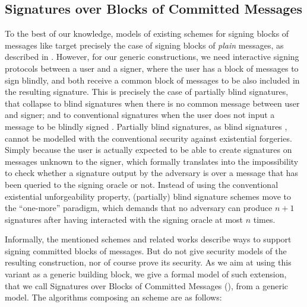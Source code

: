 \subsection{Signatures over Blocks of Committed Messages}
\label{sapp:sbcm}

To the best of our knowledge, models of existing schemes for signing blocks of
messages like \cite{cl02,asm06,ps16} target precisely the case of signing blocks
of \emph{plain} messages, as described in . However, for our
generic constructions, we need interactive signing protocols between a user
and a signer, where the user has a block of messages to sign blindly, and both
receive a common block of messages to be also included in the resulting
signature. This is precisely the case of partially blind signatures, that
collapse to blind signatures when there is no common message between user
and signer; and to conventional signatures when the user does not input a
message to be blindly signed \cite{ao00}. Partially blind signatures, as
blind signatures \cite{ps96}, cannot be modelled with the conventional security
against existential forgeries. Simply because the user is actually expected to
be able to create signatures on messages unknown to the signer, which formally
translates into the impossibility to check whether a signature output by the
adversary is over a message that has been queried to the signing oracle or not.
Instead of using the conventional existential unforgeability property,
(partially) blind signature schemes move to the ``one-more'' paradigm, which
demands that no adversary can produce $n+1$ signatures after having interacted
with the signing oracle at most $n$ times.

Informally, the mentioned \SBM schemes \cite{cl02,asm06,ps16} and related works
\cite{cdl16b}  describe ways to support signing committed blocks of
messages. But do not give security models of the resulting construction, nor
of course prove its security. As we aim at using this variant as a generic
building block, we give a formal model of such extension, that we call
Signatures over Blocks of Committed Messages (\SBCM), from a generic \SBM model.
The algorithms composing an \SBCM scheme are as follows:

